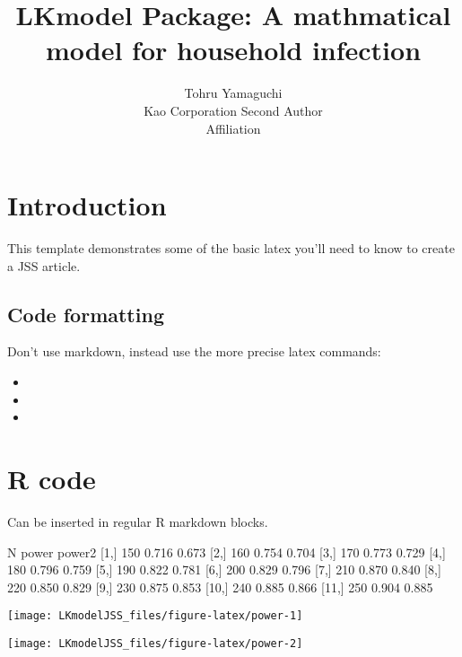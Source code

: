 \documentclass[jss]{jss}
\author{
Tohru Yamaguchi\\Kao Corporation \And Second Author\\Affiliation
}
\title{LKmodel Package: A mathmatical model for household infection
\pkg{LKmodel}}
\begin{document}
\hypertarget{introduction}{%
\section{Introduction}\label{introduction}}

This template demonstrates some of the basic latex you'll need to know
to create a JSS article.

\hypertarget{code-formatting}{%
\subsection{Code formatting}\label{code-formatting}}

Don't use markdown, instead use the more precise latex commands:

\begin{itemize}
\item
\item
\item
\end{itemize}

\hypertarget{r-code}{%
\section{R code}\label{r-code}}

Can be inserted in regular R markdown blocks.

\begin{CodeChunk}

\begin{CodeOutput}
        N power power2
 [1,] 150 0.716  0.673
 [2,] 160 0.754  0.704
 [3,] 170 0.773  0.729
 [4,] 180 0.796  0.759
 [5,] 190 0.822  0.781
 [6,] 200 0.829  0.796
 [7,] 210 0.870  0.840
 [8,] 220 0.850  0.829
 [9,] 230 0.875  0.853
[10,] 240 0.885  0.866
[11,] 250 0.904  0.885
\end{CodeOutput}


\begin{center}\texttt{[image: LKmodelJSS\_files/figure-latex/power-1]} \end{center}



\begin{center}\texttt{[image: LKmodelJSS\_files/figure-latex/power-2]} \end{center}

\end{CodeChunk}
\end{document}
